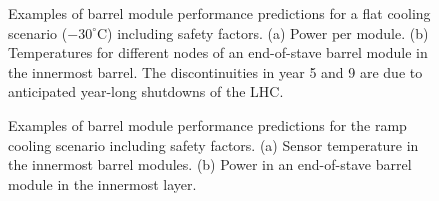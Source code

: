 \begin{figure}[ht]
\centering
{}\quad\quad
{}
\caption{Examples of barrel module performance predictions for a flat cooling scenario ($-30^\circ$C) including safety factors. (a) Power per module. (b) Temperatures for different nodes of an end-of-stave barrel module in the innermost barrel. The discontinuities in year 5 and 9 are due to anticipated year-long shutdowns of the LHC.}
\label{fig:moduleflatperformance}
\end{figure}

\begin{figure}[ht]
\centering
{}\quad\quad
{}
\caption{Examples of barrel module performance predictions for the ramp cooling scenario including safety factors. (a) Sensor temperature in the innermost barrel modules. (b) Power in an end-of-stave barrel module in the innermost layer.}
\label{fig:modulerampperformance}
\end{figure}

